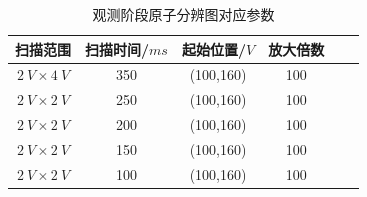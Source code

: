 \documentclass[aps,pre,12pt,preprint,onecolumn,showpacs,showkeys]{revtex4-1}
\begin{document}
\begin{table}[h]
	\caption{观测阶段原子分辨图对应参数}
	\begin{ruledtabular}
		\begin{tabular}{cccccc}
			
			扫描范围 &  扫描时间/$\si{ms}$  & 起始位置/$\si{V}$ & 放大倍数\\
			\hline
            $2\ \si{V} \times4\ \si{V}$ & 350 & (100,160) & 100\\
            $2\ \si{V} \times2\ \si{V}$ & 250 & (100,160) & 100\\
            $2\ \si{V} \times2\ \si{V}$ & 200 & (100,160) & 100\\
            $2\ \si{V} \times2\ \si{V}$ & 150 & (100,160) & 100\\
            $2\ \si{V} \times2\ \si{V}$ & 100 & (100,160) & 100\\

			
		\end{tabular}
	\end{ruledtabular}
	\label{tab:5}
\end{table}
\end{document}
